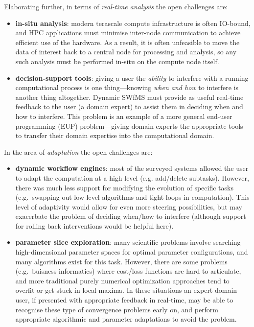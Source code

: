 \documentclass[a4paper,fontsize=12pt]{scrartcl}
\begin{document}
Elaborating further, in terms of \emph{real-time analysis} the open
challenges are:
\begin{itemize}
\item \textbf{in-situ analysis}: modern terascale compute
  infrastructure is often IO-bound, and HPC applications must minimise
  inter-node communication to achieve efficient use of the hardware.
  As a result, it is often unfeasible to move the data of interest
  back to a central node for processing and analysis, so any such
  analysis must be performed in-situ\cite{Bennett2012} on the compute
  node itself.
\item \textbf{decision-support tools}: giving a user the
  \emph{ability} to interfere with a running computational process is
  one thing---knowing \emph{when and how} to interfere is another
  thing altogether. Dynamic SWfMS must provide as useful real-time
  feedback to the user (a domain expert) to assist them in deciding
  when and how to interfere. This problem is an example of a more
  general end-user programming (EUP)\cite{Myers2006} problem---giving
  domain experts the appropriate tools to transfer their domain
  expertise into the computational domain.
\end{itemize}
In the area of \emph{adaptation} the open challenges are:
\begin{itemize}
\item \textbf{dynamic workflow engines}: most of the surveyed systems
  allowed the user to adapt the computation at a high level (e.g.
  add/delete subtasks). However, there was much less support for
  modifying the evolution of specific tasks (e.g.~swapping out
  low-level algorithms and tight-loops in computation). This level of
  adaptivity would allow for even more steering possibilities, but may
  exacerbate the problem of deciding when/how to interfere (although
  support for rolling back interventions would be helpful here).
\item \textbf{parameter slice exploration}: many scientific problems
  involve searching high-dimensional parameter spaces for optimal
  parameter configurations, and many algorithms exist for this task.
  However, there are some problems (e.g.~buisness informatics) where
  cost/loss functions are hard to articulate, and more traditional
  purely numerical optimization approaches tend to overfit or get
  stuck in local maxima. In these situations an expert domain user, if
  presented with appropriate feedback in real-time, may be able to
  recognise these type of convergence problems early on, and perform
  appropriate algorithmic and parameter adaptations to avoid the
  problem.
\end{itemize}
\end{document}
